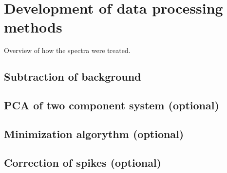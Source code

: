 \section{Development of data processing methods}

Overview of how the spectra were treated.





\subsection{Subtraction of background}
\subsection{PCA of two component system (optional)}
\subsection{Minimization algorythm (optional)}
\subsection{Correction of spikes (optional)}



